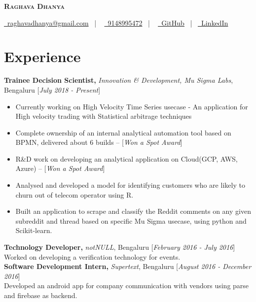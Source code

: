 \documentclass[10pt]{article}
\renewcommand{\textbf}[1]{{\bfseries\color{accent_darkest}#1}}
\begin{document}
\thispagestyle{empty}


\begin{center}
 \textbf{\textsc{\color{anotherred}\Huge Raghava Dhanya}}\\[10pt] %
\end{center}

\begin{center}
 \href{mailto:raghavadhanya@gmail.com}{\faEnvelope\ raghavadhanya@gmail.com}
 \ | \ %
 \href{tel:9148995472}{\faPhoneSquare\ 9148995472} \ | \ %
 \href{https://github.com/RaghavaDhanya}{ \underline{\faGithubSquare\
 GitHub}} \ | \ \href{https://in.linkedin.com/in/raghavadhanya}{\underline
 {\faLinkedinSquare\ LinkedIn}} 
\end{center}


\section*{Experience} 
\textbf{Trainee Decision Scientist,} \textit{Innovation \& Development, Mu Sigma Labs},
 Bengaluru \hfill \textcolor{grey_darker}{[\textit{July 2018 - Present}]}
\begin{itemize}
    \itemsep0em
    \item Currently working on High Velocity Time Series usecase - An application for High velocity trading with Statistical arbitrage techniques 
    \item Complete ownership of an internal analytical automation tool based on BPMN, delivered about 6 builds  -- [\textit{Won a Spot Award}] 
    \item R\&D work on developing an analytical application on Cloud(GCP, AWS, Azure) -- [\textit{Won a Spot Award}]
    \item Analysed and developed a model for identifying customers who are likely to churn out of telecom operator
    using R.
    \item Built an application to scrape and classify the Reddit comments on any given subreddit and thread based
    on specific Mu Sigma usecase, using python and Scikit-learn.
\end{itemize}
\textbf{Technology Developer,} \textit{notNULL},
Bengaluru \hfill \textcolor{grey_darker}{[\textit{February 2016 - July 2016}]}\\
Worked on developing a verification technology for events.
\medskip
\\
\textbf{Software Development Intern,} \textit{Supertext}, Bengaluru
\hfill \textcolor{grey_darker}{[\textit{August 2016 - December 2016}]}\\
Developed an android app for company communication with vendors using
parse and firebase as backend. 
\end{document}
